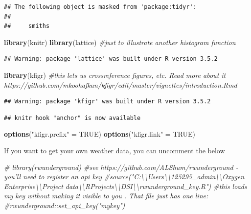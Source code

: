 \documentclass[]{article}
\newenvironment{Shaded}{\begin{snugshade}}{\end{snugshade}}
\newcommand{\CommentTok}[1]{\textcolor[rgb]{0.56,0.35,0.01}{\textit{#1}}}
\newcommand{\KeywordTok}[1]{\textcolor[rgb]{0.13,0.29,0.53}{\textbf{#1}}}
\newcommand{\NormalTok}[1]{#1}
\newcommand{\OtherTok}[1]{\textcolor[rgb]{0.56,0.35,0.01}{#1}}
\newcommand{\StringTok}[1]{\textcolor[rgb]{0.31,0.60,0.02}{#1}}
\begin{document}
\begin{verbatim}
## The following object is masked from 'package:tidyr':
## 
##     smiths
\end{verbatim}

\begin{Shaded}
\begin{Highlighting}[]
  \KeywordTok{library}\NormalTok{(knitr)}
  \KeywordTok{library}\NormalTok{(lattice) }\CommentTok{#just to illustrate another histogram function}
\end{Highlighting}
\end{Shaded}

\begin{verbatim}
## Warning: package 'lattice' was built under R version 3.5.2
\end{verbatim}

\begin{Shaded}
\begin{Highlighting}[]
  \KeywordTok{library}\NormalTok{(kfigr) }\CommentTok{#this lets us crossreference figures, etc. Read more about it https://github.com/mkoohafkan/kfigr/edit/master/vignettes/introduction.Rmd }
\end{Highlighting}
\end{Shaded}

\begin{verbatim}
## Warning: package 'kfigr' was built under R version 3.5.2
\end{verbatim}

\begin{verbatim}
## knitr hook "anchor" is now available
\end{verbatim}

\begin{Shaded}
\begin{Highlighting}[]
  \KeywordTok{options}\NormalTok{(}\StringTok{"kfigr.prefix"}\NormalTok{ =}\StringTok{ }\OtherTok{TRUE}\NormalTok{)}
  \KeywordTok{options}\NormalTok{(}\StringTok{"kfigr.link"}\NormalTok{ =}\StringTok{ }\OtherTok{TRUE}\NormalTok{)}
\end{Highlighting}
\end{Shaded}

If you want to get your own weather data, you can uncomment the below

\begin{Shaded}
\begin{Highlighting}[]
\CommentTok{#    library(rwunderground) #see https://github.com/ALShum/rwunderground - you'll need to register an api key}
\CommentTok{#source("C:\textbackslash{}\textbackslash{}Users\textbackslash{}\textbackslash{}125295_admin\textbackslash{}\textbackslash{}Oxygen Enterprise\textbackslash{}\textbackslash{}Project data\textbackslash{}\textbackslash{}RProjects\textbackslash{}\textbackslash{}DSI\textbackslash{}\textbackslash{}rwunderground_key.R") #this loads my key without making it visible to you . That file just has one line: }
  \CommentTok{#rwunderground::set_api_key("mykey")}
\end{Highlighting}
\end{Shaded}
\end{document}
